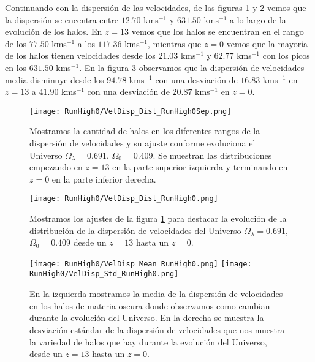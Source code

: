 Continuando con la dispersión de las velocidades, de las figuras \ref{fig:High0-VelDispDistSep} y \ref{fig:High0-VelDispDist} vemos que la dispersión se encentra entre $12.70$ kms$^{-1}$ y $631.50$ kms$^{-1}$ a lo largo de la evolución de los halos. En $z=13$ vemos que los halos se encuentran en el rango de los $77.50$ kms$^{-1}$ a los $117.36$ kms$^{-1}$, mientras que $z=0$ vemos que la mayoría de los halos tienen velocidades desde los $21.03$ kms$^{-1}$ y $62.77$ kms$^{-1}$ con los picos en los $631.50$ kms$^{-1}$. En la figura \ref{fig:High0-VelDispStats} observamos que la dispersión de velocidades media disminuye desde los $94.78$ kms$^{-1}$ con una desviación de $16.83$ kms$^{-1}$ en $z=13$ a $41.90$ kms$^{-1}$ con una desviación de $20.87$ kms$^{-1}$ en $z=0$.

\begin{figure}[H]
    \centering
    \texttt{[image: RunHigh0/VelDisp\_Dist\_RunHigh0Sep.png]}
    \caption[Dispersión de velocidades]{\footnotesize Mostramos la cantidad de halos en los diferentes rangos de la dispersión de velocidades y su ajuste conforme evoluciona el Universo $\Omega_\lambda = 0.691$, $\Omega_0 = 0.409$. Se muestran las distribuciones empezando en $z=13$ en la parte superior izquierda y terminando en $z=0$ en la parte inferior derecha.}
    \label{fig:High0-VelDispDistSep}
\end{figure}

\begin{figure}[H]
    \centering
    \texttt{[image: RunHigh0/VelDisp\_Dist\_RunHigh0.png]}
    \caption[Distribución de la dispersión de velocidades]{\footnotesize Mostramos los ajustes de la figura \ref{fig:High0-VelDispDistSep} para destacar la evolución de la distribución de la dispersión de velocidades del Universo $\Omega_\lambda = 0.691$, $\Omega_0 = 0.409$ desde un $z=13$ hasta un $z=0$.}
    \label{fig:High0-VelDispDist}
\end{figure}

\begin{figure}[H]
    \centering
    \texttt{[image: RunHigh0/VelDisp\_Mean\_RunHigh0.png]}
    \texttt{[image: RunHigh0/VelDisp\_Std\_RunHigh0.png]}
    \caption[Media y desviación estándar de la dispersión de velocidades]{\footnotesize En la izquierda mostramos la media de la dispersión de velocidades en los halos de materia oscura donde observamos como cambian durante la evolución del Universo. En la derecha se muestra la desviación estándar de la dispersión de velocidades que nos muestra la variedad de halos que hay durante la evolución del Universo, desde un $z=13$ hasta un $z=0$.}
    \label{fig:High0-VelDispStats}
\end{figure}

